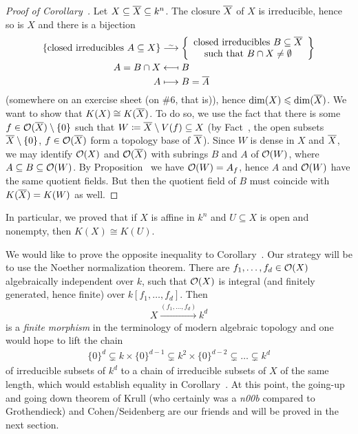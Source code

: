 \documentclass[a4paper,parskip=half,numbers=enddot, DIV=12]{scrreprt}
\renewcommand{\leq}{\leqslant}
\begin{document}
	\begin{proof}[Proof of Corollary~]
		Let $X\subseteq\overline X\subseteq k^n$. The closure $\overline X$ of $X$ is irreducible, hence so is $X$ and there is a bijection
		\begin{align*}
			\{\text{closed irreducibles }A\subseteq X\}&\isomorphism\left\{
			\begin{array}{c}
				\text{closed irreducibles }B\subseteq\ov X\\
				\text{such that }B\cap X\not=\emptyset
			\end{array}\right\}\\
			A=B\cap X&\longmapsfrom B\\
			A&\longmapsto B=\ov A
		\end{align*}
		(somewhere on an exercise sheet (on \#6, that is)), hence $\dim (X)\leq\dim (\ov X)$. We want to show that $K(X)\cong K(\overline X)$. To do so, we use the fact that there is some $f\in\mathcal{O}(\overline X)\setminus\{0\}$ such that $W\coloneqq \overline X\setminus V(f)\subseteq X$ (by Fact~, the open subsets $\overline X\setminus\{0\}$, $f\in\mathcal{O}(\overline X)$ form a topology base of $\overline X$). Since $W$ is dense in $X$ and $\overline X$, we may identify $\mathcal{O}(X)$ and $\mathcal{O}(\overline X)$ with subrings $B$ and $A$ of $\mathcal{O}(W)$, where $A\subseteq B\subseteq \mathcal{O}(W)$. By Proposition~ we have $\mathcal{O}(W)=A_f$, hence $A$ and $\mathcal{O}(W)$ have the same quotient fields. But then the quotient field of $B$ must coincide with $K(\overline X)=K(W)$ as well.
	\end{proof}
	\begin{rem*} 
		In particular, we proved that if $X$ is affine in $k^n$ and $U\subseteq X$ is open and nonempty, then $K(X)\cong K(U)$.
	\end{rem*}
	
	We would like to prove the opposite inequality to Corollary~. Our strategy will be to use the Noether normalization theorem. There are $f_1,\ldots,f_d\in\mathcal{O}(X)$ algebraically independent over $k$, such that $\mathcal{O}(X)$ is integral (and finitely generated, hence finite) over $k[f_1,\ldots,f_d]$. Then
	\begin{align*}
		X\xrightarrow{(f_1,\ldots,f_d)}k^d
	\end{align*}
	is a \emph{finite morphism} in the terminology of modern algebraic topology and one would hope to lift the chain
	\begin{align*}
		\{0\}^d\subsetneq k\times\{0\}^{d-1}\subsetneq k^2\times\{0\}^{d-2}\subsetneq\ldots\subsetneq k^d
	\end{align*}
	of irreducible subsets of $k^d$ to a chain of irreducible subsets of $X$ of the same length, which would establish equality in Corollary~. At this point, the going-up and going down theorem of Krull (who certainly was a \emph{n00b} compared to Grothendieck) and Cohen/Seidenberg are our friends and will be proved in the next section.
	
\end{document}
